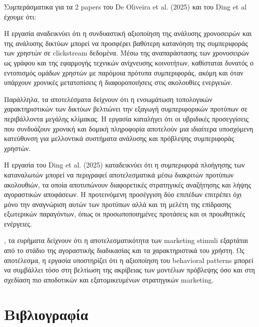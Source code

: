 \documentclass[12pt,a4paper]{article}
\begin{document}
    Συμπεράσματικα για τα 2 papers του De Oliveira et al. (2025) και του  Ding et al έχουμε ότι:
    
    Η εργασία αναδεικνύει ότι η συνδυαστική αξιοποίηση της ανάλυσης χρονοσειρών και της ανάλυσης δικτύων μπορεί να προσφέρει βαθύτερη κατανόηση της συμπεριφοράς των χρηστών σε clickstream δεδομένα. Μέσω της αναπαράστασης των χρονοσειρών ως γράφου και της εφαρμογής τεχνικών ανίχνευσης κοινοτήτων, καθίσταται δυνατός ο εντοπισμός ομάδων χρηστών με παρόμοια πρότυπα συμπεριφοράς, ακόμη και όταν υπάρχουν χρονικές μετατοπίσεις ή διαφοροποιήσεις στις ακολουθίες ενεργειών.
    
    Παράλληλα, τα αποτελέσματα δείχνουν ότι η ενσωμάτωση τοπολογικών χαρακτηριστικών των δικτύων βελτιώνει την εξαγωγή συμπεριφορικών προτύπων σε περιβάλλοντα μεγάλης κλίμακας. Η εργασία καταλήγει ότι οι υβριδικές προσεγγίσεις που συνδυάζουν χρονική και δομική πληροφορία αποτελούν μια ιδιαίτερα υποσχόμενη κατεύθυνση για μελλοντικά συστήματα ανάλυσης και πρόβλεψης συμπεριφοράς χρηστών.
    
    Η εργασία του Ding et al. (2025) καταδεικνύει ότι η συμπεριφορά πλοήγησης των καταναλωτών μπορεί να περιγραφεί αποτελεσματικά μέσω διακριτών προτύπων ακολουθιών, τα οποία αποτυπώνουν διαφορετικές στρατηγικές αναζήτησης και λήψης αγοραστικών αποφάσεων. Η προτεινόμενη προσέγγιση δύο επιπέδων επιτρέπει όχι μόνο την αναγνώριση αυτών των προτύπων αλλά και τη μελέτη της επίδρασης εξωτερικών παραγόντων, όπως οι προσωποποιημένες προτάσεις και οι προωθητικές ενέργειες.
    
    , τα ευρήματα δείχνουν ότι η αποτελεσματικότητα των marketing stimuli εξαρτάται από το στάδιο της αγοραστικής διαδικασίας και τα χαρακτηριστικά του χρήστη. Ως αποτέλεσμα, η εργασία υποστηρίζει ότι η αξιοποίηση του behavioral patterns μπορεί να συμβάλλει τόσο στη βελτίωση της ακρίβειας των μοντέλων πρόβλεψης όσο και στη σχεδίαση πιο αποδοτικών και εξατομικευμένων στρατηγικών marketing.
    

	\newpage
	\section{Βιβλιογραφία}
		
	
	
	
	
\end{document}

